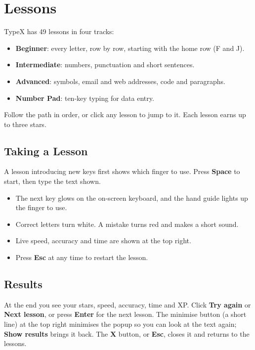 \chapter{Lessons}
TypeX has 49 lessons in four tracks:
\begin{itemize}
\item \textbf{Beginner}: every letter, row by row, starting with the home row (F and J).
\item \textbf{Intermediate}: numbers, punctuation and short sentences.
\item \textbf{Advanced}: symbols, email and web addresses, code and paragraphs.
\item \textbf{Number Pad}: ten-key typing for data entry.
\end{itemize}
Follow the path in order, or click any lesson to jump to it. Each lesson earns up to three stars.

\section{Taking a Lesson}
A lesson introducing new keys first shows which finger to use. Press \textbf{Space} to start, then type the text shown.
\begin{itemize}
\item The next key glows on the on-screen keyboard, and the hand guide lights up the finger to use.
\item Correct letters turn white. A mistake turns red and makes a short sound.
\item Live speed, accuracy and time are shown at the top right.
\item Press \textbf{Esc} at any time to restart the lesson.
\end{itemize}

\section{Results}
At the end you see your stars, speed, accuracy, time and XP. Click \textbf{Try again} or \textbf{Next lesson}, or press \textbf{Enter} for the next lesson.
The minimise button (a short line) at the top right minimises the popup so you can look at the text again; \textbf{Show results} brings it back. The \textbf{X} button, or \textbf{Esc}, closes it and returns to the lessons.

